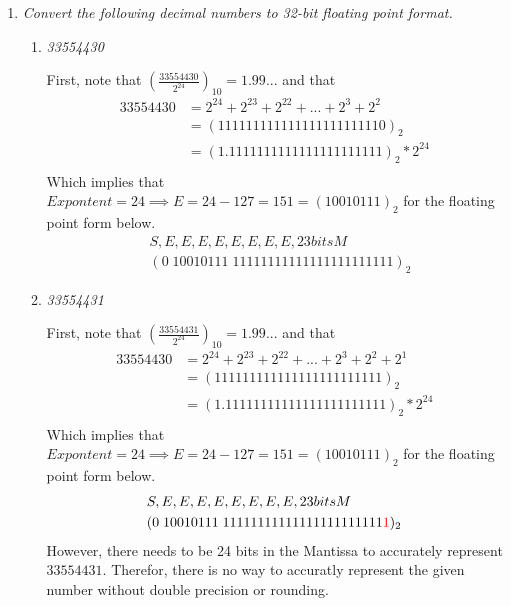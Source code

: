 \documentclass[12pt]{article}
\begin{document}
\begin{enumerate}
\newpage
\item \textit{Convert the following decimal numbers to 32-bit floating point format.}
  \begin{enumerate}
      \item \textit{33554430} \\
          \begin{center}
            First, note that $(\frac{33554430}{2^{24}})_{10} = 1.99...$ and that
            \begin{align*}
              33554430 &= 2^{24} + 2^{23} + 2^{22} + ... + 2^3 + 2^2 \\
              &= (1111 1111 1111 1111 1111 1110)_2 \\
              &= (1.1111 1111 1111 1111 1111 11)_2 * 2^{24} \\
            \end{align*}
            Which implies that $Expontent = 24 \implies E = 24 - 127 = 151 = (10010111)_2$ for the floating point form below.
            \begin{align*}
              &S,E,E,E,E,E,E,E,E,23bitsM \\
              &(0\;10010111\;1111 1111 1111 1111 1111 111)_2
            \end{align*}
          \end{center}
      \item \textit{33554431} \\
      \begin{center}
        First, note that $(\frac{33554431}{2^{24}})_{10} = 1.99...$ and that
        \begin{align*}
          33554430 &= 2^{24} + 2^{23} + 2^{22} + ... + 2^3 + 2^2 + 2^1\\
          &= (1111 1111 1111 1111 1111 1111)_2 \\
          &= (1.1111 1111 1111 1111 1111 111)_2 * 2^{24} \\
        \end{align*}
        Which implies that $Expontent = 24 \implies E = 24 - 127 = 151 = (10010111)_2$ for the floating point form below.
        \begin{align*}
          &S,E,E,E,E,E,E,E,E,23bitsM \\
          &(0\;10010111\;1111 1111 1111 1111 1111 111\color{red}{1}\color{black}{)_2}
        \end{align*}
        However, there needs to be 24 bits in the Mantissa to accurately represent $33554431$. Therefor, there is no way to accuratly represent the given number without double precision or rounding.
      \end{center}
  \end{enumerate}


\end{enumerate}
\end{document}
